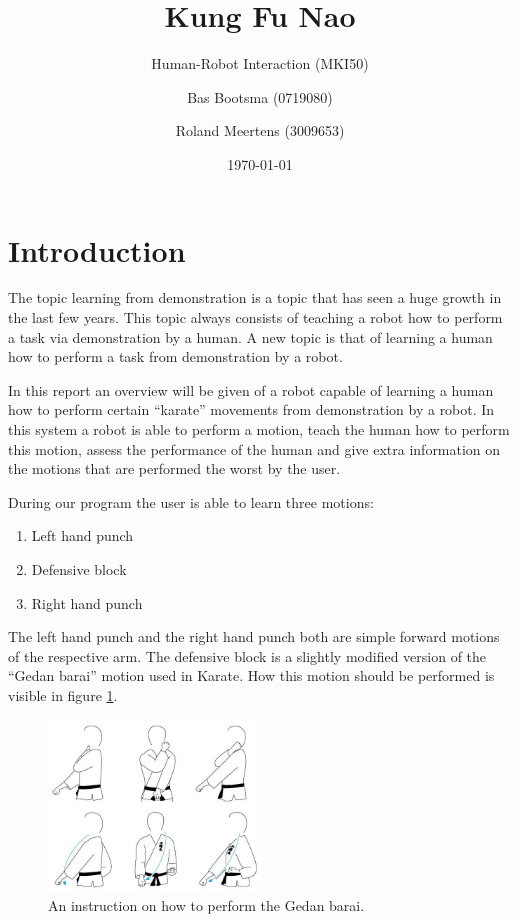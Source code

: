 \documentclass[10pt,a4paper,oneside]{scrartcl}
\begin{document}
\title{Kung Fu Nao}
\subtitle{Human-Robot Interaction (MKI50)}

\author{ Bas Bootsma (0719080) \and Roland Meertens (3009653)}

\date{\today}

\maketitle

\section{Introduction}
The topic learning from demonstration is a topic that has seen a huge growth in the last few years.
This topic always consists of teaching a robot how to perform a task via demonstration by a human.  
A new topic is that of learning a human how to perform a task from demonstration by a robot. 

In this report an overview will be given of a robot capable of learning a human how to perform certain ``karate'' movements from demonstration by a robot. 
In this system a robot is able to perform a motion, teach the human how to perform this motion, assess the performance of the human and give extra information on the motions that are performed the worst by the user. 

During our program the user is able to learn three motions: 
\begin{enumerate}
  \item Left hand punch
  \item Defensive block
  \item Right hand punch
\end{enumerate}
The left hand punch and the right hand punch both are simple forward motions of the respective arm. 
The defensive block is a slightly modified version of the ``Gedan barai'' motion used in Karate. 
How this motion should be performed is visible in figure \ref{fig:gedanBarai}. 

\begin{figure}[!ht]
	\centering
	\includegraphics[width=0.5\textwidth]{images/gedanBarai}
	\caption{An instruction on how to perform the Gedan barai.}
	\label{fig:gedanBarai}
\end{figure}
\end{document}
